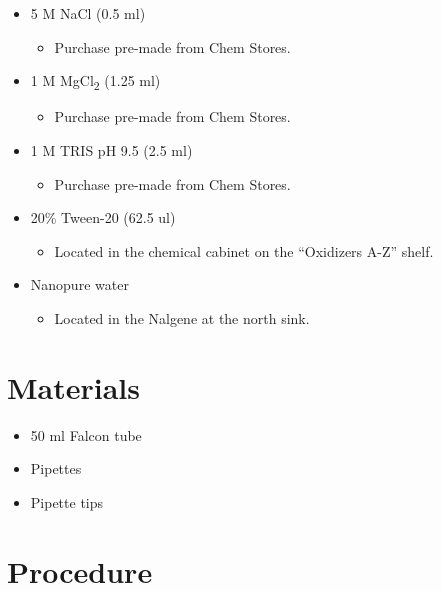 \documentclass[
  letterpaper,
  DIV=11,
  numbers=noendperiod]{scrreprt}
\providecommand{\tightlist}{%
  \setlength{\itemsep}{0pt}\setlength{\parskip}{0pt}}\usepackage{longtable,booktabs,array}
\begin{document}
\begin{itemize}
\tightlist
\item
  5 M NaCl (0.5 ml)

  \begin{itemize}
  \tightlist
  \item
    Purchase pre-made from Chem Stores.
  \end{itemize}
\item
  1 M MgCl\textsubscript{2} (1.25 ml)

  \begin{itemize}
  \tightlist
  \item
    Purchase pre-made from Chem Stores.
  \end{itemize}
\item
  1 M TRIS pH 9.5 (2.5 ml)

  \begin{itemize}
  \tightlist
  \item
    Purchase pre-made from Chem Stores.
  \end{itemize}
\item
  20\% Tween-20 (62.5 ul)

  \begin{itemize}
  \tightlist
  \item
    Located in the chemical cabinet on the ``Oxidizers A-Z'' shelf.
  \end{itemize}
\item
  Nanopure water

  \begin{itemize}
  \tightlist
  \item
    Located in the Nalgene at the north sink.
  \end{itemize}
\end{itemize}

\hypertarget{materials-96}{%
\section{Materials}\label{materials-96}}

\begin{itemize}
\tightlist
\item
  50 ml Falcon tube
\item
  Pipettes
\item
  Pipette tips
\end{itemize}

\hypertarget{procedure-95}{%
\section{Procedure}\label{procedure-95}}
\end{document}
